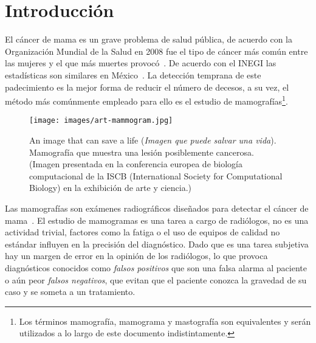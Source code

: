 \chapter{Introducción}
\label{generalidades}
 \setcounter{page}{1}


El cáncer de mama es un grave problema de salud pública, de acuerdo con la
Organización Mundial de la Salud en 2008 fue el tipo de cáncer más común entre
las mujeres y el que más muertes provocó~\cite{cancerreport}. De acuerdo con el
INEGI las estadísticas son similares en México~\cite{mxcancer, inegi}. La
detección temprana de este padecimiento es la mejor forma de reducir el número
de decesos, a su vez, el método más comúnmente empleado para ello es el estudio
de mamografías\footnote{Los términos mamografía, mamograma y mastografía son
equivalentes y serán utilizados a lo largo de este documento indistintamente.}.

\begin{figure}[h]
    \centering

    \texttt{[image: images/art-mammogram.jpg]}

  \caption[An image that can save a life] {An image that can save a life
  (\textit{Imagen que puede salvar una vida}). Mamografía que muestra una
  lesión posiblemente cancerosa. (Imagen presentada en la  conferencia
  europea de biología computacional de la ISCB (International Society for
  Computational Biology) en la exhibición de arte y ciencia.)}

  \label{bits}
\end{figure}

Las mamografías son exámenes radiográficos diseñados para detectar el cáncer de
mama~\cite{bushberg2011essential}. El estudio de mamogramas es una tarea a
cargo de radiólogos, no es una actividad trivial, factores como la fatiga o el
uso de equipos de calidad no estándar influyen en la precisión del diagnóstico.
Dado que es una tarea subjetiva hay un margen de error en la opinión de los
radiólogos, lo que provoca diagnósticos conocidos como \textit{falsos
positivos} que son una falsa alarma al paciente o aún peor \textit{falsos
negativos}, que evitan que el paciente conozca la gravedad de su caso y se
someta a un tratamiento.

